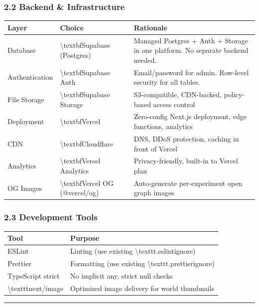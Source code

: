 \documentclass[11pt,a4paper]{article}
\begin{document}
\subsubsection*{2.2 Backend \& Infrastructure}

\begin{longtable}{lll}
\toprule
Layer & Choice & Rationale \\
\midrule
\endhead
Database & \textbackslash{}textbf{Supabase (Postgres)} & Managed Postgres + Auth + Storage in one platform. No separate backend needed. \\
Authentication & \textbackslash{}textbf{Supabase Auth} & Email/password for admin. Row-level security for all tables. \\
File Storage & \textbackslash{}textbf{Supabase Storage} & S3-compatible, CDN-backed, policy-based access control \\
Deployment & \textbackslash{}textbf{Vercel} & Zero-config Next.js deployment, edge functions, analytics \\
CDN & \textbackslash{}textbf{Cloudflare} & DNS, DDoS protection, caching in front of Vercel \\
Analytics & \textbackslash{}textbf{Vercel Analytics} & Privacy-friendly, built-in to Vercel plan \\
OG Images & \textbackslash{}textbf{Vercel OG (@vercel/og)} & Auto-generate per-experiment open graph images \\
\bottomrule
\end{longtable}

\subsubsection*{2.3 Development Tools}

\begin{longtable}{ll}
\toprule
Tool & Purpose \\
\midrule
\endhead
ESLint & Linting (use existing \textbackslash{}texttt{.eslintignore}) \\
Prettier & Formatting (use existing \textbackslash{}texttt{.prettierignore}) \\
TypeScript strict & No implicit any, strict null checks \\
\textbackslash{}texttt{next/image} & Optimized image delivery for world thumbnails \\
\bottomrule
\end{longtable}

\noindent\rule{\textwidth}{0.4pt}
\end{document}
